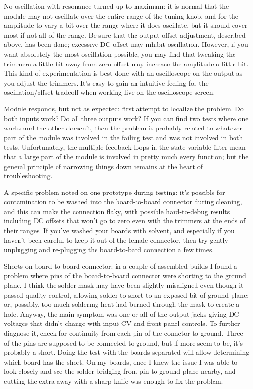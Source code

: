 No oscillation with resonance turned up to maximum:  it is normal that the
module may not oscillate over the entire range of the tuning knob, and for
the amplitude to vary a bit over the range where it does oscillate, but it
should cover most if not all of the range.  Be sure that the output offset
adjustment, described above, has been done; excessive DC offset may inhibit
oscillation.  However, if you want absolutely the most oscillation possible,
you may find that tweaking the trimmers a little bit away from zero-offset
may increase the amplitude a little bit.  This kind of experimentation is
best done with an oscilloscope on the output as you adjust the trimmers. 
It's easy to gain an intuitive feeling for the oscillation/offset tradeoff
when working live on the oscilloscope screen.

Module responds, but not as expected:  first attempt to localize the
problem.  Do both inputs work?  Do all three outputs work?  If you can find
two tests where one works and the other doesen't, then the problem is
probably related to whatever part of the module was involved in the failing
test and was not involved in both tests.  Unfortunately, the multiple
feedback loops in the state-variable filter mean that a large part of the
module is involved in pretty much every function; but the general principle
of narrowing things down remains at the heart of troubleshooting.

A specific problem noted on one prototype during testing:  it's possible for
contamination to be washed into the board-to-board connector during
cleaning, and this can make the connection flaky, with possible
hard-to-debug results including DC offsets that won't go to zero even with
the trimmers at the ends of their ranges.  If you've washed your boards with
solvent, and especially if you haven't been careful to keep it out of the
female connector, then try gently unplugging and re-plugging the
board-to-bard connection a few times.

Shorts on board-to-board connector:  in a couple of assembled builds I found
a problem where pins of the board-to-board connector were shorting to the
ground plane.  I think the solder mask may have been slightly misaligned
even though it passed quality control, allowing solder to short to an
exposed bit of ground plane; or, possibly, too much soldering heat
had burned through the mask to create a hole.  Anyway, the main symptom was
one or all of the output jacks giving DC voltages that didn't change with
input CV and front-panel controls.  To further diagnose it, check for
continuity from each pin of the connctor to ground.  Three of the pins are
supposed to be connected to ground, but if more seem to be, it's
probably a short.  Doing the test with the boards separated will allow
determining which board has the short.  On my boards,
once I knew the issue I was able to look closely and see the solder bridging
from pin to ground plane nearby, and cutting the extra away with a sharp
knife was enough to fix the problem.

